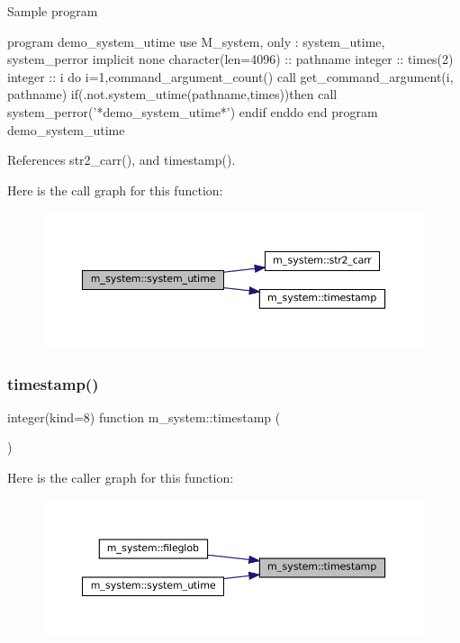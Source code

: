 \begin{DoxyVerb}  Sample program

   program demo_system_utime
   use M_system, only : system_utime, system_perror
   implicit none
   character(len=4096) :: pathname
   integer             :: times(2)
   integer             :: i
      do i=1,command_argument_count()
         call get_command_argument(i, pathname)
         if(.not.system_utime(pathname,times))then
            call system_perror('*demo_system_utime*')
         endif
      enddo
   end program demo_system_utime \end{DoxyVerb}
 

References str2\+\_\+carr(), and timestamp().

Here is the call graph for this function\+:\nopagebreak
\begin{figure}[H]
\begin{center}
\leavevmode
\includegraphics[width=350pt]{namespacem__system_a83a121ba0b525210b5217565569ef350_cgraph}
\end{center}
\end{figure}
\mbox{\label{namespacem__system_a635baf5850927faa97461afaca512235}} 
\subsubsection{\texorpdfstring{timestamp()}{timestamp()}}
{\footnotesize\ttfamily integer(kind=8) function m\+\_\+system\+::timestamp (\begin{DoxyParamCaption}{ }\end{DoxyParamCaption})\hspace{0.3cm}{\ttfamily [private]}}

Here is the caller graph for this function\+:\nopagebreak
\begin{figure}[H]
\begin{center}
\leavevmode
\includegraphics[width=350pt]{namespacem__system_a635baf5850927faa97461afaca512235_icgraph}
\end{center}
\end{figure}


